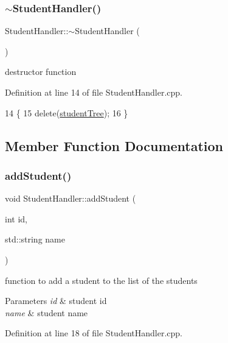 \subsubsection{\texorpdfstring{$\sim$\+Student\+Handler()}{~StudentHandler()}}
{\footnotesize\ttfamily Student\+Handler\+::$\sim$\+Student\+Handler (\begin{DoxyParamCaption}{ }\end{DoxyParamCaption})\hspace{0.3cm}{\ttfamily [virtual]}}

destructor function 

Definition at line 14 of file Student\+Handler.\+cpp.


\begin{DoxyCode}
14                                 \{
15     \textcolor{keyword}{delete}(\hyperlink{class_student_handler_a7141eccd57a30aa140e5b4e92b0939ea}{studentTree});
16 \}
\end{DoxyCode}


\subsection{Member Function Documentation}
\mbox{\label{class_student_handler_ae7219f3612d49a8bda1cb14c48557b37}} 
\subsubsection{\texorpdfstring{add\+Student()}{addStudent()}\hspace{0.1cm}{\footnotesize\ttfamily [1/2]}}
{\footnotesize\ttfamily void Student\+Handler\+::add\+Student (\begin{DoxyParamCaption}\item[{int}]{id,  }\item[{std\+::string}]{name }\end{DoxyParamCaption})}

function to add a student to the list of the students 
\begin{DoxyParams}{Parameters}
{\em id} & student id \\
\hline
{\em name} & student name \\
\hline
\end{DoxyParams}


Definition at line 18 of file Student\+Handler.\+cpp.


